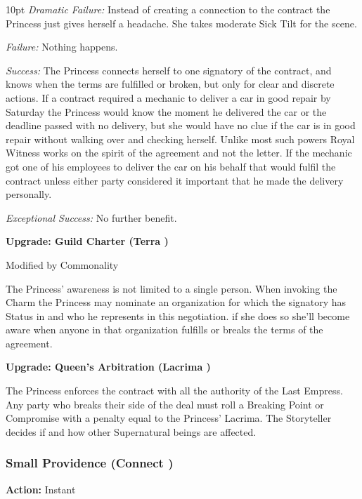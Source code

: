 \begin{myindentpar}{10pt}    \emph{Dramatic Failure:} Instead of creating a connection to the contract the Princess just gives herself a headache. She takes moderate Sick Tilt for the scene. 

\emph{Failure:} Nothing happens. 

\emph{Success:} The Princess connects herself to one signatory of the contract, and knows when the terms are fulfilled or broken, but only for clear and discrete actions. If a contract required a mechanic to deliver a car in good repair by Saturday the Princess would know the moment he delivered the car or the deadline passed with no delivery, but she would have no clue if the car is in good repair without walking over and checking herself. Unlike most such powers Royal Witness works on the spirit of the agreement and not the letter. If the mechanic got one of his employees to deliver the car on his behalf that would fulfil the contract unless either party considered it important that he made the delivery personally. 

\emph{Exceptional Success:} No further benefit.

    \textbf{Upgrade: Guild Charter (Terra \textbullet)}
	
	Modified by Commonality
	
	The Princess' awareness is not limited to a single person. When invoking the Charm the Princess may nominate an organization for which the signatory has Status in and who he represents in this negotiation. if she does so she'll become aware when anyone in that organization fulfills or breaks the terms of the agreement. 
	
	\textbf{Upgrade: Queen's Arbitration (Lacrima \textbullet\textbullet\textbullet)}
	
	The Princess enforces the contract with all the authority of the Last Empress. Any party who breaks their side of the deal must roll a Breaking Point or Compromise with a penalty equal to the Princess' Lacrima. The Storyteller decides if and how other Supernatural beings are affected.
	
 \end{myindentpar}


\subsubsection*{Small Providence (Connect \textbullet)}

\noindent \textbf{Action:} Instant

